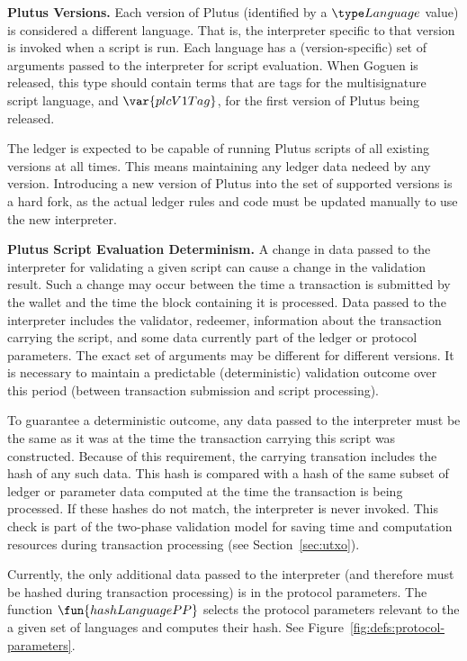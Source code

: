 \textbf{Plutus Versions.} Each
version of Plutus (identified by a $\Language$ value) is considered a different
language. That is, the interpreter
specific to that version is invoked when a script is run. Each language
has a (version-specific) set of arguments passed to the interpreter
for script evaluation. When Goguen is released, this type should contain
terms that are tags for the multisignature script language, and $\var{plcV1Tag}$,
for the first version of Plutus being released.

The ledger is expected to be capable of running Plutus scripts of
all existing versions at all times. This means maintaining any ledger
data nedeed by any version. Introducing a new version of Plutus
into the set of supported versions is a hard fork, as the actual ledger rules
and code must be updated manually to use the new interpreter.

\textbf{Plutus Script Evaluation Determinism.}
A change in data passed to the interpreter for
validating a given script can cause a change in the validation result. Such
a change may occur between the time a transaction is submitted by the wallet
and the time the block containing it is processed. Data passed to the interpreter
includes the validator, redeemer, information about the transaction carrying
the script, and some data currently part of the ledger or protocol parameters.
The exact set of arguments may be different for different versions.
It is necessary to maintain a predictable
(deterministic) validation outcome over this period (between transaction
submission and script processing).

To guarantee a deterministic outcome,
any data passed to the interpreter must be
the same as it was at the time the transaction carrying this script was
constructed.
Because of this requirement, the carrying transation includes the hash of any such data.
This hash is compared with
a hash of the same subset of ledger or parameter data computed at the time the transaction is being
processed. If these hashes do not match, the interpreter is never invoked.
This check is part of the two-phase validation model for saving time and computation
resources during transaction processing (see Section~\ref{sec:utxo}).

Currently, the only additional data passed to the interpreter (and therefore must
be hashed during transaction processing) is in the protocol parameters. The
function $\fun{hashLanguagePP}$ selects the protocol parameters relevant to
the a given set of languages and computes their hash.
See Figure~\ref{fig:defs:protocol-parameters}.

